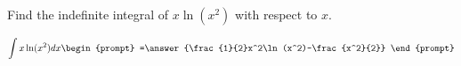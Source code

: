 \documentclass{ximera}
\author{Gregory Hartman \and Matthew Carr}
\begin{document}
\begin{exercise}

Find the indefinite integral of $x\ln(x^2)$ with respect to $x$.

\[
\int x\ln(x^2) dx
\begin{prompt}
=\answer{\frac{1}{2}x^2\ln(x^2)-\frac{x^2}{2}}
\end{prompt}
\]


\end{exercise}
\end{document}

